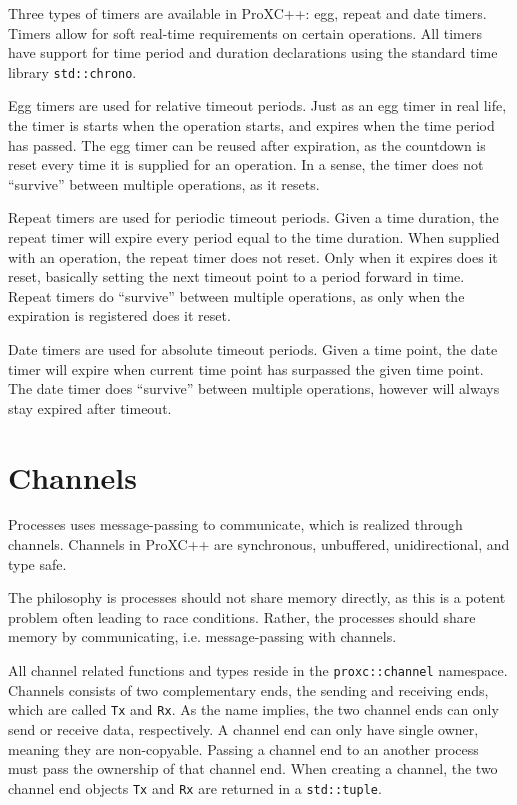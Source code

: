 Three types of timers are available in ProXC++: egg, repeat and date timers. Timers allow for soft real\hyp{}time requirements on certain operations. All timers have support for time period and duration declarations using the standard time library \lstinline[style={CustomC++}]|std::chrono|.

Egg timers are used for relative timeout periods. Just as an egg timer in real life, the timer is starts when the operation starts, and expires when the time period has passed. The egg timer can be reused after expiration, as the countdown is reset every time it is supplied for an operation. In a sense, the timer does not ``survive'' between multiple operations, as it resets.

Repeat timers are used for periodic timeout periods. Given a time duration, the repeat timer will expire every period equal to the time duration. When supplied with an operation, the repeat timer does not reset. Only when it expires does it reset, basically setting the next timeout point to a period forward in time. Repeat timers do ``survive'' between multiple operations, as only when the expiration is registered does it reset. 

Date timers are used for absolute timeout periods. Given a time point, the date timer will expire when current time point has surpassed the given time point. The date timer does ``survive'' between multiple operations, however will always stay expired after timeout. 


\section{Channels}


Processes uses message\hyp{}passing to communicate, which is realized through channels. Channels in ProXC++ are synchronous, unbuffered, unidirectional, and type safe. 

The philosophy is processes should not share memory directly, as this is a potent problem often leading to race conditions. Rather, the processes should share memory by communicating, i.e. message\hyp{}passing with channels.

All channel related functions and types reside in the \lstinline[style={CustomC++}]|proxc::channel| namespace. Channels consists of two complementary ends, the sending and receiving ends, which are called \lstinline[style={CustomC++}]|Tx| and \lstinline[style={CustomC++}]|Rx|. As the name implies, the two channel ends can only send or receive data, respectively. A channel end can only have single owner, meaning they are non\hyp{}copyable. Passing a channel end to an another process must pass the ownership of that channel end. When creating a channel, the two channel end objects \lstinline[style={CustomC++}]|Tx| and \lstinline[style={CustomC++}]|Rx| are returned in a \lstinline[style={CustomC++}]|std::tuple|.

